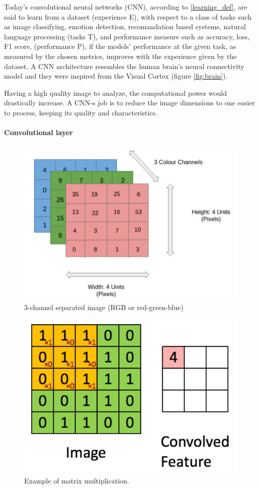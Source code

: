 \documentclass[runningheads,a4paper,12pt]{report}
\begin{document}
Today's convolutional neural networks (CNN), according to \ref{learning_def}, are said to learn from a dataset (experience E), with respect to a class of tasks such as image classifying, emotion detection, recomandation based systems, natural language processing (tasks T), and performance measure such as accuracy, loss, F1 score, (performance P), if the models' performance at the given task, as measured by
the chosen metrics, improves with the experience given by the dataset. A CNN architecture resembles the human brain's neural connectivity model and they were inspired from the Visual Cortex (figure \ref{fig:brain}).

Having a high quality image to analyze, the computational power would drastically increase. A CNN-s job is to reduce the image dimensions to one easier to process, keeping its quality and characteristics. 

\paragraph{Convolutional layer\\}

\begin{figure}[h]
	\centering

  	\includegraphics[width=0.7\linewidth]{./images/1_pixels}\hfill

    \caption{3-channel separated image (RGB or red-green-blue)}  
    \label{fig:pixels}
\end{figure} 

\begin{figure}[h]
	\centering

  	\includegraphics[width=0.7\linewidth]{./images/1_matrix_multiplication}\hfill

    \caption{Example of matrix multiplication.}  
    \label{fig:matrix_multiplication}
\end{figure} 
\end{document}
